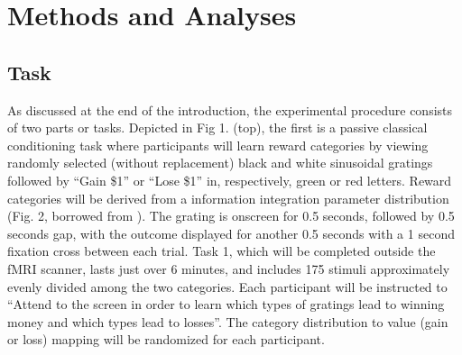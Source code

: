 \documentclass[doc,12pt]{apa}        %
\begin{document}

\section{Methods and Analyses} %
\label{sec:methods}
\subsection{Task} %
\label{sub:task}
As discussed at the end of the introduction, the experimental procedure consists of two parts or tasks.  Depicted in Fig 1. (top), the first is a passive classical conditioning task where participants will learn reward categories by viewing randomly selected (without replacement) black and white sinusoidal gratings followed by ``Gain \$1'' or ``Lose \$1'' in, respectively, green or red letters.  Reward categories will be derived from a information integration parameter distribution (Fig. 2, borrowed from \cite{Spiering:2008p5008}).  The grating is onscreen for 0.5 seconds, followed by 0.5 seconds gap, with the outcome displayed for another 0.5 seconds with a 1 second fixation cross between each trial. Task 1, which will be completed outside the fMRI scanner, lasts just over 6 minutes, and includes 175 stimuli approximately evenly divided among the two categories.  Each participant will be instructed to ``Attend to the screen in order to learn which types of gratings lead to winning money and which types lead to losses''.  The category distribution to value (gain or loss) mapping will be randomized for each participant.
\end{document}
